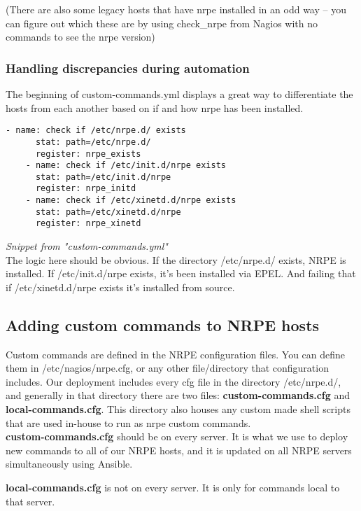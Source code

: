 \documentclass[a4paper]{article}
\begin{document}
(There are also some legacy hosts that have nrpe installed in an odd way -- you can figure out which these are by using check\_nrpe from Nagios with no commands to see the nrpe version)

\subsubsection{Handling discrepancies during automation}
The beginning of custom-commands.yml displays a great way to differentiate the hosts from each another based on if and how nrpe has been installed.

\begin{lstlisting}[language=nagconf]
    - name: check if /etc/nrpe.d/ exists
      stat: path=/etc/nrpe.d/
      register: nrpe_exists
    - name: check if /etc/init.d/nrpe exists
      stat: path=/etc/init.d/nrpe
      register: nrpe_initd
    - name: check if /etc/xinetd.d/nrpe exists
      stat: path=/etc/xinetd.d/nrpe
      register: nrpe_xinetd
\end{lstlisting}
\hfill \textit{Snippet from "custom-commands.yml"}\\


The logic here should be obvious. If the directory /etc/nrpe.d/ exists, NRPE is installed. If /etc/init.d/nrpe exists, it's been installed via EPEL. And failing that if /etc/xinetd.d/nrpe exists it's installed from source.

\subsection{Adding custom commands to NRPE hosts}
Custom commands are defined in the NRPE configuration files. You can define them in /etc/nagios/nrpe.cfg, or any other file/directory that configuration includes. Our deployment includes every cfg file in the directory /etc/nrpe.d/, and generally in that directory there are two files: \textbf{custom-commands.cfg} and \textbf{local-commands.cfg}. This directory also houses any custom made shell scripts that are used in-house to run as nrpe custom commands.\\

\textbf{custom-commands.cfg} should be on every server. It is what we use to deploy new commands to all of our NRPE hosts, and it is updated on all NRPE servers simultaneously using Ansible.

\textbf{local-commands.cfg} is not on every server. It is only for commands local to that server. 
\end{document}
